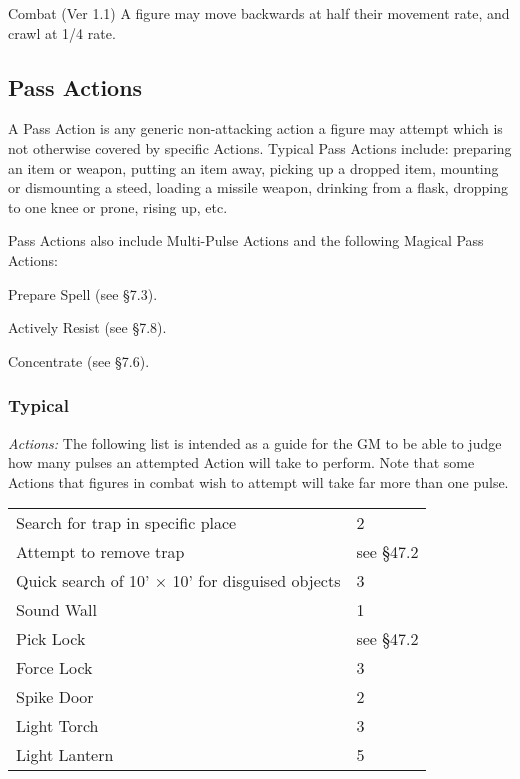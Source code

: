 \begin{Chapter}{Combat (Ver 1.1)}
A figure may move backwards at half their movement rate, and crawl at
1/4 rate.

\subsection{Pass Actions}

A Pass Action is any generic non-attacking action a figure may attempt
which is not otherwise covered by specific Actions.  Typical Pass
Actions include: preparing an item or weapon, putting an item away,
picking up a dropped item, mounting or dismounting a steed, loading a
missile weapon, drinking from a flask, dropping to one knee or prone,
rising up, etc.

Pass Actions also include Multi-Pulse Actions and the following
Magical Pass Actions:

\begin{Itemize}
  
\item Prepare Spell (see §7.3).

\item Actively Resist (see §7.8).  

\item Concentrate (see §7.6). 

\end{Itemize}

\subsubsection{Typical}

\emph{Actions:} The following list is intended as a guide for the GM
to be able to judge how many pulses an attempted Action will take to
perform.  Note that some Actions that figures in combat wish to
attempt will take far more than one pulse.

\begin{tabularx}{\columnwidth}{Xp{16mm}}
Search for trap in specific place		& 2 \\
Attempt to remove trap				& see §47.2 \\
Quick search of 10’ × 10’ for disguised objects	& 3 \\
Sound Wall					& 1 \\
Pick Lock					& see §47.2 \\
Force Lock					& 3 \\
Spike Door					& 2 \\
Light Torch					& 3 \\
Light Lantern					& 5 \\
\end{tabularx}


\end{Chapter}
